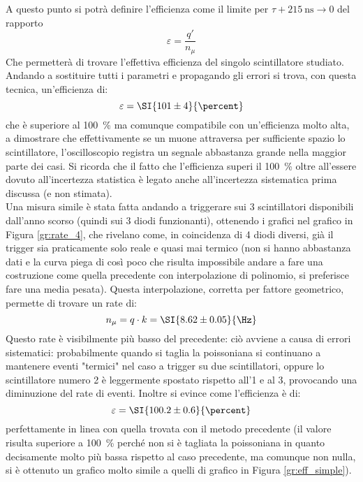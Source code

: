 A questo punto si potrà definire l'efficienza come il limite per $\tau + \SI{215}{\nano\s} \to 0$ del rapporto
\begin{equation}
	\varepsilon = \frac{q'}{n_\mu}
	\label{eq:eff}
\end{equation}
Che permetterà di trovare l'effettiva efficienza del singolo scintillatore studiato. Andando a sostituire tutti i parametri e propagando gli errori si trova, con questa tecnica, un'efficienza di:
\begin{equation}
  \varepsilon = \SI{101 \pm 4}{\percent}
\end{equation}
che è superiore al \SI{100}{\percent} ma comunque compatibile con un'efficienza molto alta, a dimostrare che effettivamente se un muone attraversa per sufficiente spazio lo scintillatore, l'oscilloscopio registra un segnale abbastanza grande nella maggior parte dei casi. Si ricorda che il fatto che l'efficienza superi il \SI{100}{\percent} oltre all'essere dovuto all'incertezza statistica \`e legato anche all'incertezza sistematica prima discussa (e non stimata).\\

Una misura simile è stata fatta andando a triggerare sui 3 scintillatori disponibili dall'anno scorso (quindi sui 3 diodi funzionanti), ottenendo i grafici nel grafico in Figura \ref{gr:rate_4}, che rivelano come, in coincidenza di 4 diodi diversi, già il trigger sia praticamente solo reale e quasi mai termico (non si hanno abbastanza dati e la curva piega di così poco che risulta impossibile andare a fare una costruzione come quella precedente con interpolazione di polinomio, si preferisce fare una media pesata). Questa interpolazione, corretta per fattore geometrico, permette di trovare un rate di:
\begin{equation}
  n_\mu = q \cdot k = \SI{8.62 \pm 0.05}{\Hz}
\end{equation}
Questo rate è visibilmente più basso del precedente: ciò avviene a causa di errori sistematici: probabilmente quando si taglia la poissoniana si continuano a mantenere eventi "termici" nel caso a trigger su due scintillatori, oppure lo scintillatore numero 2 è leggermente spostato rispetto all'1 e al 3, provocando una diminuzione del rate di eventi.
Inoltre si evince come l'efficienza è di:
\begin{equation}
  \varepsilon = \SI{100.2 \pm 0.6}{\percent}
\end{equation}
perfettamente in linea con quella trovata con il metodo precedente (il valore risulta superiore a \SI{100}{\percent} perché non si è tagliata la poissoniana in quanto decisamente molto più bassa rispetto al caso precedente, ma comunque non nulla, si \`e ottenuto un grafico molto simile a quelli di grafico in Figura \ref{gr:eff_simple}).

